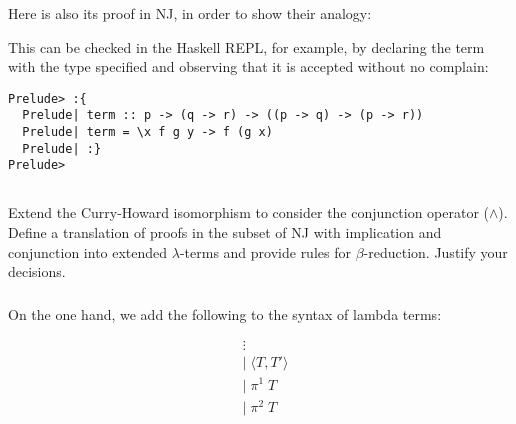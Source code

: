 \documentclass{article}
\begin{document}
Here is also its proof in NJ, in order to show their
analogy:

\begin{mathpar}
\end{mathpar}

This can be checked in the Haskell REPL, for example, 
by declaring the term with the type specified and 
observing that it is accepted without no complain:

\begin{verbatim}
Prelude> :{
  Prelude| term :: p -> (q -> r) -> ((p -> q) -> (p -> r))
  Prelude| term = \x f g y -> f (g x)
  Prelude| :}
Prelude>
\end{verbatim}

\subsection{}\label{ex:2}

Extend the Curry-Howard isomorphism to consider the 
conjunction operator ($\land$). Define a translation
of proofs in the subset of NJ with implication and 
conjunction into extended $\lambda$-terms and provide 
rules for $\beta$-reduction. Justify your decisions.

\subsubsection{}

On the one hand, we add the following to the syntax 
of lambda terms:

\begin{align*}
  &\vdots\\
  &|\;\langle T, T' \rangle\\
  &|\;\pi^1\;T\\
  &|\;\pi^2\;T\\
\end{align*}
\end{document}
